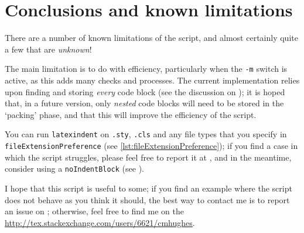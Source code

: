\section{Conclusions and known limitations}
 \label{sec:knownlimitations}
 There are a number of known limitations of the script, and almost certainly quite a few that are \emph{unknown}!

 The main limitation is to do with efficiency, particularly when the \texttt{-m} switch is active, as this adds many checks and processes.
 The current implementation relies upon finding and storing \emph{every} code block (see the discussion on ); it is hoped that, in a future version, only \emph{nested} code blocks will need to be stored in the `packing' phase, and that this will improve the efficiency of the script.

 You can run \texttt{latexindent} on \texttt{.sty}, \texttt{.cls} and any file types that you specify in \lstinline[breaklines=true]!fileExtensionPreference! (see \vref{lst:fileExtensionPreference}); if you find a case in which the script struggles, please feel free to report it at \cite{latexindent-home}, and in the meantime, consider using a \texttt{noIndentBlock} (see ).

 I hope that this script is useful to some; if you find an example where the script does not behave as you think it should, the best way to contact me is to report an issue on \cite{latexindent-home}; otherwise, feel free to find me on the \url{http://tex.stackexchange.com/users/6621/cmhughes}.
